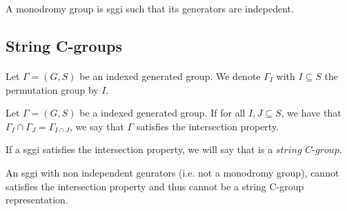 \begin{definition}
  A monodromy group is sggi such that its generators are indepedent.
\end{definition}

\subsection{String C-groups}

\paragraph{}
Let $\Gamma = (G,S)$ be an indexed generated group. We denote $\Gamma_I$ with $I \subseteq S$ the permutation group by $I$.

\begin{definition}
  Let $\Gamma = (G,S)$ be a indexed generated group. If for all $I, J \subseteq S$, we have that $\Gamma_I \cap \Gamma_J = \Gamma_{I \cap J}$, we say that $\Gamma$ satisfies the intersection property.
\end{definition}

\begin{definition}
  If a sggi satisfies the intersection property, we will say that is a $\textit{string C-group}$.
\end{definition}

\begin{property}
  \label{not-monodromy-intersection}
  An sggi with non independent genrators (i.e. not a monodromy group), cannot satisfies the intersection property and thus cannot be a string C-group representation.
\end{property}
